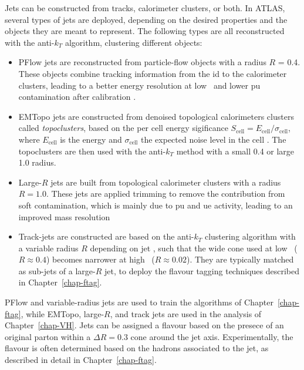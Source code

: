 Jets can be constructed from tracks, calorimeter clusters, or both. In ATLAS, several types of jets are deployed, depending on the desired properties and the objects they are meant to represent. The following types are all reconstructed with the anti-$k_T$ algorithm, clustering different objects:
\begin{itemize}[leftmargin=*]
\item PFlow jets are reconstructed from particle-flow objects \cite{atlasPFLOWjet} with a radius $R$ = 0.4. These objects combine tracking information from the \gls{id} to the calorimeter clusters, leading to a better energy resolution at low \pt\ and lower \gls{pu} contamination after calibration \cite{PhysRevD.96.072002}.
\item EMTopo jets are constructed from denoised topological calorimeters clusters called \textit{topoclusters}, based on the per cell energy sigificance $S_{\text{cell}} = E_{\text{cell}} / \sigma_{\text{cell}}$, where $E_{\text{cell}}$ is the energy and $\sigma_{\text{cell}}$ the expected noise level in the cell \cite{atlasEMTOpo}. The topoclusters are then used with the anti-$k_T$ method with a small 0.4 or large 1.0 radius.
\item Large-$R$ jets are built from topological calorimeter clusters with a radius $R = 1.0$. These jets are applied trimming to remove the contribution from soft contamination, which is mainly due to \gls{pu} and \gls{ue} activity, leading to an improved mass resolution \cite{ATLAS:largeRjet}
\item Track-jets are constructed are based on the anti-$k_T$ clustering algorithm with a variable radius $R$ depending on jet \pt, such that the wide cone used at low \pt\ ($R \approx 0.4$) becomes narrower at high \pt\ ($R \approx 0.02$). They are typically matched as sub-jets of a large-$R$ jet, to deploy the flavour tagging techniques described in Chapter~\ref{chap-ftag}.
\end{itemize}
PFlow and variable-radius jets are used to train the algorithms of Chapter~\ref{chap-ftag}, while EMTopo, large-$R$, and track jets are used in the analysis of Chapter~\ref{chap-VH}. Jets can be assigned a flavour based on the presece of an original parton within a $\Delta R = 0.3$ cone around the jet axis. Experimentally, the flavour is often determined based on the hadrons associated to the jet, as described in detail in Chapter~\ref{chap-ftag}. \\

